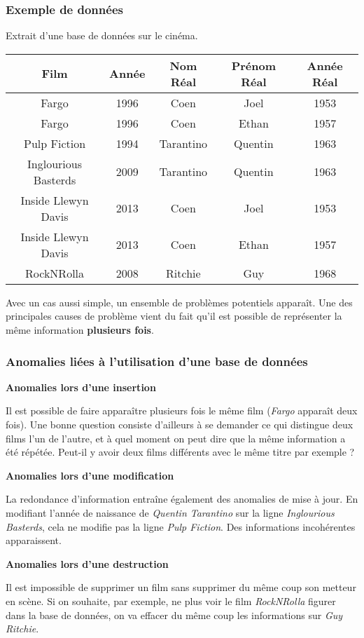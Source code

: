 \begin{frame}[fragile]
\frametitle{Exemple de données}

Extrait d'une base de données sur le cinéma.

\begin{center}
\begin{tabular}{|c|c|c|c|c|}
\hline
\textbf{Film} & \textbf{Année} & \textbf{Nom Réal} & \textbf{Prénom Réal} & \textbf{Année Réal} \\
\hline
Fargo & 1996 & Coen & Joel & 1953 \\
\hline
Fargo & 1996 & Coen & Ethan & 1957 \\
\hline
Pulp Fiction & 1994 & Tarantino & Quentin & 1963 \\
\hline
Inglourious Basterds & 2009 & Tarantino & Quentin & 1963 \\
\hline
Inside Llewyn Davis & 2013 & Coen & Joel & 1953 \\
\hline
Inside Llewyn Davis & 2013 & Coen & Ethan & 1957 \\
\hline
RockNRolla & 2008 & Ritchie & Guy & 1968 \\
\hline
\end{tabular}
\end{center}

Avec un cas aussi simple, un ensemble de problèmes potentiels apparaît. Une des principales causes de problème vient du fait qu'il est possible de représenter la même information \textbf{plusieurs fois}.
\end{frame}

\begin{frame}[fragile]
\frametitle{Anomalies liées à l'utilisation d'une base de données}

\textbf{Anomalies lors d'une insertion}

Il est possible de faire apparaître plusieurs fois le même film (\textit{Fargo} apparaît deux fois). Une bonne question consiste d'ailleurs à se demander ce qui distingue deux films l'un de l'autre, et à quel moment on peut dire que la même information a été répétée. Peut-il y avoir deux films différents avec le même titre par exemple ?

\textbf{Anomalies lors d'une modification}

La redondance d'information entraîne également des anomalies de mise à jour. En modifiant l'année de naissance de \textit{Quentin Tarantino} sur la ligne \textit{Inglourious Basterds}, cela ne modifie pas la ligne \textit{Pulp Fiction}. Des informations incohérentes apparaissent.

\textbf{Anomalies lors d'une destruction}

Il est impossible de supprimer un film sans supprimer du même coup son metteur en scène. Si on souhaite, par exemple, ne plus voir le film \textit{RockNRolla} figurer dans la base de données, on va effacer du même coup les informations sur \textit{Guy Ritchie}.
\end{frame}

